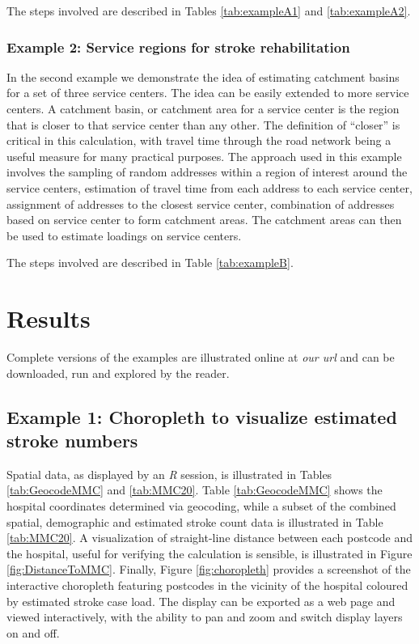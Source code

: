 \documentclass[utf8]{frontiersHLTH}
\begin{document}
The steps involved are described in Tables \ref{tab:exampleA1} and \ref{tab:exampleA2}.

\subsubsection{Example 2: Service regions for stroke
rehabilitation}\label{example-2-service-regions-for-stroke-rehabilitation}

In the second example we demonstrate the idea of estimating catchment
basins for a set of three service centers. The idea can be easily
extended to more service centers. A catchment basin, or catchment area
for a service center is the region that is closer to that service center
than any other. The definition of ``closer'' is critical in this
calculation, with travel time through the road network being a useful
measure for many practical purposes. The approach used in this example
involves the sampling of random addresses within a region of interest
around the service centers, estimation of travel time from each address
to each service center, assignment of addresses to the closest service
center, combination of addresses based on service center to form
catchment areas. The catchment areas can then be used to estimate
loadings on service centers.

The steps involved are described in Table \ref{tab:exampleB}.

\section{Results}
Complete versions of the examples are illustrated online at {\em our
  url} and can be downloaded, run and explored by the reader.

\subsection{Example 1: Choropleth to visualize estimated stroke numbers}
Spatial data, as displayed by an {\em R} session, is illustrated in
Tables \ref{tab:GeocodeMMC} and \ref{tab:MMC20}. Table
\ref{tab:GeocodeMMC} shows the hospital
coordinates determined via geocoding, while a subset of the combined spatial,
demographic and estimated stroke count data is illustrated in Table
\ref{tab:MMC20}. A visualization of straight-line distance between
each postcode and the hospital, useful for verifying the calculation
is sensible, is illustrated in Figure
\ref{fig:DistanceToMMC}. Finally, Figure \ref{fig:choropleth} provides
a screenshot of the interactive choropleth featuring postcodes in the
vicinity of the hospital coloured by estimated stroke case load. The display
can be exported as a web page and viewed interactively, with the ability to
pan and zoom and switch display layers on and off.
\end{document}
